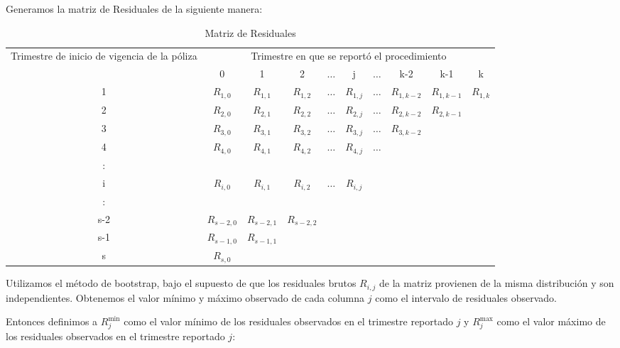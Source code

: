 \documentclass[11pt,twoside,openright,spanish]{report}
\numberwithin{equation}{chapter}
\numberwithin{figure}{chapter}
\numberwithin{table}{chapter}
\begin{document}
	Generamos la matriz de Residuales de la siguiente manera:
	

	\begin{table}[ht]
		\centering
			\caption{Matriz de Residuales}
		\begin{tabularx}{\linewidth}{ c|ccccccccc}
			\multirow{2}{4cm}{Trimestre de inicio de vigencia de la póliza}
			& \multicolumn{9}{c}{Trimestre en que se reportó el procedimiento} \\
			& 0  & 1 & 2 & $ \dots $ & j & $\dots $ & k-2 & k-1 &  k \\
			\midrule
			1      &  $R_{1,0}^{ }$ & $R_{1,1}^{ }$ & $R_{1,2}^{ }$ & $ \dots $ & $R_{1,j}^{ }$ & $ \dots $ & $R_{1,k-2}^{ }$ & $R_{1,k-1}^{ }$ & $R_{1,k}^{ }$ \\
			2      &  $R_{2,0}^{ }$ & $R_{2,1}^{ }$ & $R_{2,2}^{ }$ & $ \dots $ & $R_{2,j}^{ }$ & $ \dots $ & $R_{2,k-2}^{ }$ & $R_{2,k-1}^{ }$ & \\
			3      &  $R_{3,0}^{ }$ & $R_{3,1}^{ }$ & $R_{3,2}^{ }$ & $ \dots $ & $R_{3,j}^{ }$ & $ \dots $ & $R_{3,k-2}^{ }$ & & \\
			4      &  $R_{4,0}^{ }$ & $R_{4,1}^{ }$ & $R_{4,2}^{ }$ & $ \dots $ & $R_{4,j}^{ }$ & $ \dots $ & & & \\
			:      & & & & & & & & & \\
			i      &  $R_{i,0}^{ }$ & $R_{i,1}^{ }$ & $R_{i,2}^{ }$ & $ \dots $ & $R_{i,j}^{ }$ & & & & \\
			:      & & & & & & & & & \\
			s-2      &  $R_{s-2,0}^{ }$ & $R_{s-2,1}^{ }$ & $R_{s-2,2}^{ }$ & & & & & & \\
			s-1      &  $R_{s-1,0}^{ }$ & $R_{s-1,1}^{ }$ & & & & & & & \\
			s      &  $R_{s,0}^{ }$ & & & & & & & & \\
		\end{tabularx}
	\end{table}
 

 
	Utilizamos el método de bootstrap, bajo el supuesto de que los residuales brutos $R_{i,j}$ de la matriz provienen de la misma distribución y son independientes. Obtenemos el valor mínimo y máximo observado de cada columna $j$ como el intervalo de residuales observado.
	 
	Entonces definimos a $R_{j}^{\text{min}}$ como el valor mínimo de los residuales observados en el trimestre reportado $j$ y $R_{j}^{\text{max}}$ como el valor máximo de los residuales observados en el trimestre reportado $j$:
	
\end{document}
